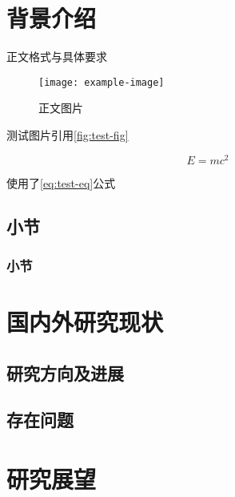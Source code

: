 \section{背景介绍}
\par 正文格式与具体要求\cite{zjuthesisrules}\cite{zjugradthesisrules}

\begin{figure}[htb]
    \centering
    \texttt{[image: example-image]}
    \caption{正文图片}
    \label{fig:test-fig}
\end{figure}

测试图片引用\autoref{fig:test-fig}

\begin{equation}
    E=mc^2
    \label{eq:test-eq}
\end{equation}

使用了\autoref{eq:test-eq}公式

\subsection{小节}

\subsubsection{小节}

\section{国内外研究现状}

\subsection{研究方向及进展}

\subsection{存在问题}

\section{研究展望}
